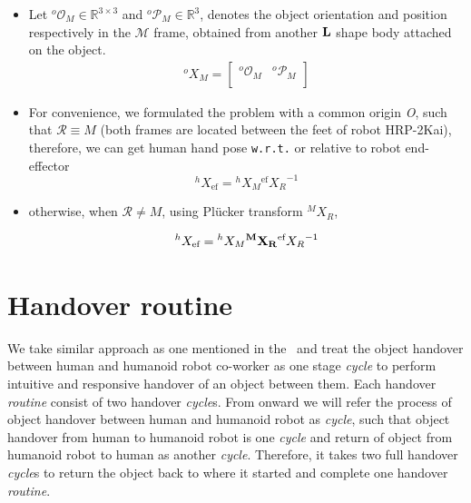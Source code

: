 \begin{itemize}
	\item Let ${{}^{o}\mathcal{O}_M} \in \mathbb{R}^{3\times3}$ and ${{}^{o}\mathcal{P}_M} \in \mathbb{R}^{3}$, denotes the object orientation and position respectively in the $\mathcal{M}$ frame, obtained from another ${\bf L}$ shape body attached on the object.
	\begin{gather}\label{X_M_o}
	{}^{o}{X}_M =
	\left[\begin{array}{cc}
	{}^{o}\mathcal{O}_M & {}^{o}\mathcal{P}_M \\
	\end{array}\right]
	\end{gather}
	
	\item For convenience, we formulated the problem with a common origin {\it O}, such that $\mathcal R \equiv M$ (both frames are located between the feet of robot HRP-2Kai), therefore, we can get human hand pose \texttt{w.r.t.} or relative to robot end-effector
	\begin{equation}\label{X_ef_h1}
	{}^{h}{X}_{\text{ef}} = {}^{h}{X}_{M}  {}^{\text{ef}}{X_{R}}^{-1}
	\end{equation}
	\item otherwise, when $\mathcal R \neq M$, using Pl\"ucker transform ${}^MX_R$,
	
	\begin{equation}\label{X_ef_h2}
	{}^{h}{X}_{\text{ef}} = {}^{h}{X}_{M}  {\bf{}^{M}{X}_R}  {}^{\text{ef}}{X_{R}}^{-1}
	\end{equation}
	
\end{itemize}


\section{Handover routine}\label{handover routine}

We take similar approach as one mentioned in the~\cite{medina2016human, nemlekarprompt} and treat the object handover between human and humanoid robot co-worker as one stage \textit{cycle} to perform intuitive and responsive handover of an object between them. Each handover \textit{routine} consist of two handover \textit{cycle}s. From onward we will refer the process of object handover between human and humanoid robot as \textit{cycle}, such that object handover from human to humanoid robot is one \textit{cycle} and return of object from humanoid robot to human as another \textit {cycle}. Therefore, it takes two full handover \textit{cycle}s to return the object back to where it started and complete one handover \textit{routine}.

